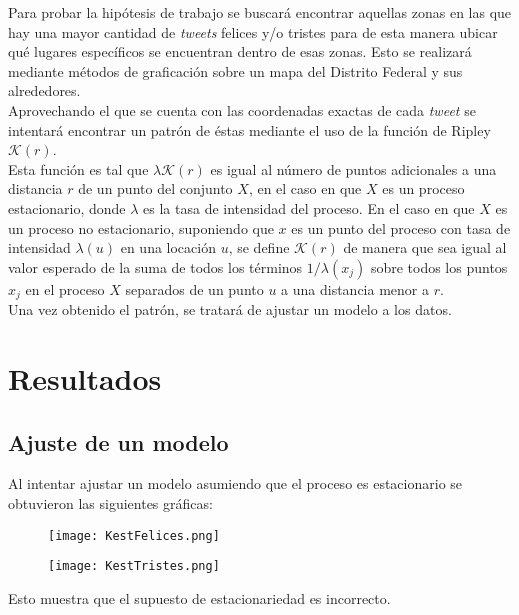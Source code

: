 \documentclass{article}
\begin{document}
	Para probar la hipótesis de trabajo se buscará encontrar aquellas zonas en las que hay una mayor cantidad de \emph{tweets} felices y/o tristes para de esta manera ubicar qué lugares específicos se encuentran dentro de esas zonas. Esto se realizará mediante métodos de graficación sobre un mapa del Distrito Federal y sus alrededores.\\[.3cm]
	Aprovechando el que se cuenta con las coordenadas exactas de cada \emph{tweet} se intentará encontrar un patrón de éstas mediante el uso de la función de Ripley $\mathcal{K} (r)$.\\[.3cm]
%
Esta función es tal que $\lambda \mathcal{K} (r)$ es igual al número de puntos adicionales a una distancia $r$ de un punto del conjunto $X$, en el caso en que $X$ es un proceso estacionario, donde $\lambda$ es la tasa de intensidad del proceso. En el caso en que $X$ es un proceso no estacionario, suponiendo que $x$ es un punto del proceso con tasa de intensidad $\lambda (u)$ en una locación $u$, se define $\mathcal{K} (r)$ de manera que sea igual al valor esperado de la suma de todos los términos $1/ \lambda(x_j)$ sobre todos los puntos $x_j$ en el proceso $X$ separados de un punto $u$ a una distancia menor a $r$. \cite{spatstat}\\[.3cm]
%
Una vez obtenido el patrón, se tratará de ajustar un modelo a los datos.\\[.3cm]



\newpage

\section{Resultados}

\subsection{Ajuste de un modelo}

	Al intentar ajustar un modelo asumiendo que el proceso es estacionario se obtuvieron las siguientes gráficas:

\begin{figure}[h!]
\centering
\texttt{[image: KestFelices.png]}
\end{figure}


\begin{figure}[h!]
\centering
\texttt{[image: KestTristes.png]}
\end{figure}


\noindent Esto muestra que el supuesto de estacionariedad es incorrecto.\\[.3cm]
\end{document}
